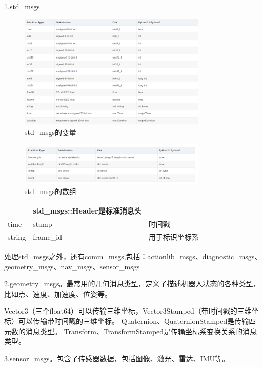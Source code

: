 1.std\_msgs
\begin{figure}[h]
    \centering
    \includegraphics[width=0.8\textwidth]{Chapter4/img/ros_message1.png}
    \caption{std\_msgs的变量}
\end{figure}
\begin{figure}[h]
    \centering
    \includegraphics[width=0.8\textwidth]{Chapter4/img/ros_message2.png}
    \caption{std\_msgs的数组}
\end{figure}


\begin{center}
    \begin{tabular}{lll}
        \hline
        &std\_msgs::Header是标准消息头& \\
        \hline
        time & stamp & 时间戳 \\
        string & frame\_id & 用于标识坐标系 \\
        \hline
    \end{tabular}
\end{center}

处理std\_msgs之外，还有comm\_msgs,包括：actionlib\_msgs、diagnostic\_msgs、geometry\_msgs、nav\_msgs、sensor\_msgs

2.geometry\_msgs。最常用的几何消息类型，定义了描述机器人状态的各种类型，比如点、速度、加速度、位姿等。

Vector3（三个float64）可以传输三维坐标，Vector3Stamped（带时间戳的三维坐标）可以传输带时间戳的三维坐标。
Quaternion、QuaternionStamped是传输四元数的消息类型。
Transform、TransformStamped是传输坐标系变换关系的消息类型。

3.sensor\_msgs。包含了传感器数据，包括图像、激光、雷达、IMU等。

